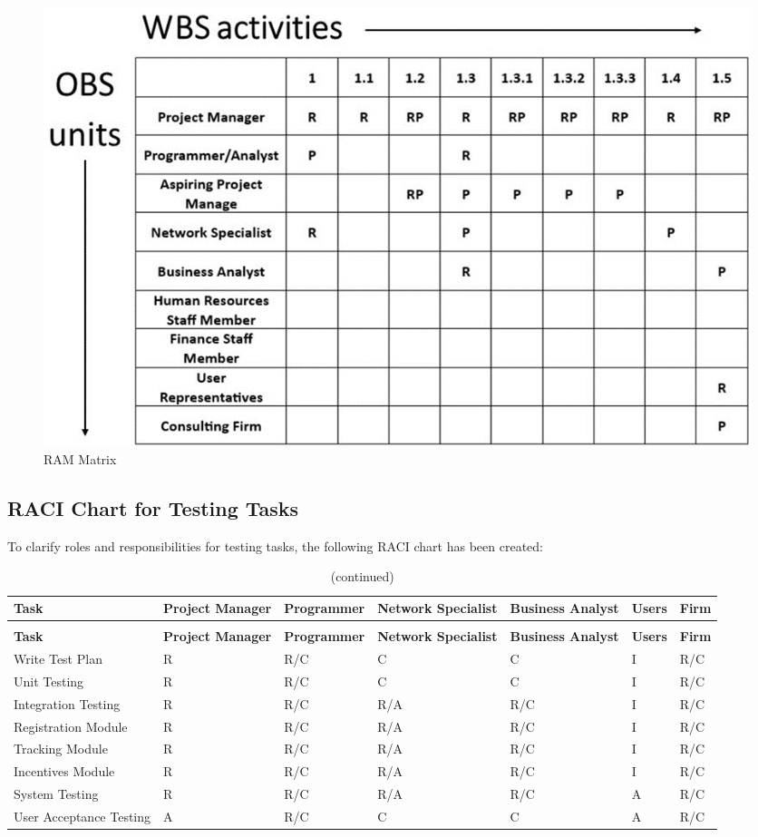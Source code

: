\begin{figure}[ht]
    \includegraphics[width=\textwidth]{images/ram.png}
    \caption{RAM Matrix}
    \label{fig:ram}
\end{figure}

\subsection{RACI Chart for Testing Tasks}

To clarify roles and responsibilities for testing tasks, the following RACI chart has been created:

\begin{longtable}{|p{3cm}|p{2cm}|p{2cm}|p{2cm}|p{2cm}|p{1cm}|p{1cm}|}
\caption{RACI Chart for Testing Tasks}
\label{tab:raci_testing} \\
\hline
\rowcolor{lightgray} \textbf{Task} & \textbf{Project Manager} & \textbf{Programmer} & \textbf{Network Specialist} & \textbf{Business Analyst} & \textbf{Users} & \textbf{Firm} \\
\hline
\endfirsthead
\caption[]{(continued)} \\
\hline
\rowcolor{lightgray} \textbf{Task} & \textbf{Project Manager} & \textbf{Programmer} & \textbf{Network Specialist} & \textbf{Business Analyst} & \textbf{Users} & \textbf{Firm} \\
\hline
\endhead
\hline
\endfoot
\hline
\endlastfoot
Write Test Plan & R & R/C & C & C & I & R/C \\
\hline
Unit Testing & R & R/C & C & C & I & R/C \\
\hline
Integration Testing & R & R/C & R/A & R/C & I & R/C \\
\hline
Registration Module & R & R/C & R/A & R/C & I & R/C \\
\hline
Tracking Module & R & R/C & R/A & R/C & I & R/C \\
\hline
Incentives Module & R & R/C & R/A & R/C & I & R/C \\
\hline
System Testing & R & R/C & R/A & R/C & A & R/C \\
\hline
User Acceptance Testing & A & R/C & C & C & A & R/C \\
\hline
\end{longtable}

